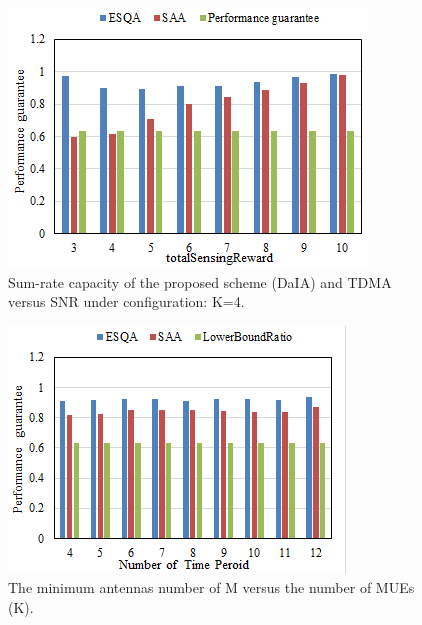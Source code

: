 \documentclass[journal]{IEEEtran}
\begin{document}
\begin{figure}[t]
	\centering
	\includegraphics[width=1\linewidth]{Fig4(b).png}
	\caption{Sum-rate capacity of the proposed scheme (DaIA) and TDMA versus SNR under configuration: K=4.}
	\label{fig:figure6}
\end{figure}
\begin{figure}[t]
	\centering
	\includegraphics[width=1\linewidth]{Fig4(d).png}
	\caption{The minimum antennas number of M versus the number of MUEs (K).}
	\label{fig:figure5}
\end{figure}
\end{document}
